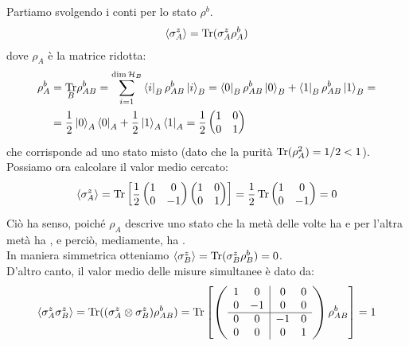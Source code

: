 \documentclass[../../InformazioneQuantistica.tex]{subfiles}
\begin{document}
Partiamo svolgendo i conti per lo stato $\rho^b$.
\begin{align*}
\langle \sigma_A^z\rangle = \operatorname{Tr}(\sigma_A^z \rho_A^b)
\end{align*}
dove $\rho_A$ è la matrice ridotta:
\begin{align*}
\rho_A^b &= \underset{B}{\operatorname{Tr}}\rho_{AB}^b = \sum_{i=1}^{\operatorname{dim}\mathcal{H}_B} \Bra{i}_B \rho_{AB}^b \Ket{i}_B = \Bra{0}_B \rho^b_{AB} \Ket{0}_B + \Bra{1}_B \rho^b_{AB} \Ket{1}_B =\\
&= \frac{1}{2}\Ket{0}_A\Bra{0}_A + \frac{1}{2}\Ket{1}_A \Bra{1}_A = \frac{1}{2}\begin{pmatrix}1 & 0\\0 & 1\end{pmatrix}
\end{align*}
che corrisponde ad uno stato misto (dato che la purità $\operatorname{Tr}(\rho_A^2)=1/2 < 1$).\\
Possiamo ora calcolare il valor medio cercato:
\begin{align*}
    \langle \sigma_A^z \rangle = \operatorname{Tr} \left[ \frac{1}{2} \begin{pmatrix}1 & 0\\ 0 & -1
    \end{pmatrix}\begin{pmatrix}1 & 0\\ 0 & 1 \end{pmatrix} \right ] = \frac{1}{2}\operatorname{Tr}\begin{pmatrix}1 & 0 \\ 0 & -1 \end{pmatrix} = 0
\end{align*}
Ciò ha senso, poiché $\rho_A$ descrive uno stato che la metà delle volte ha  e per l'altra metà ha , e perciò, mediamente, ha .\\
In maniera simmetrica otteniamo $\langle \sigma_B^z \rangle = \operatorname{Tr}(\sigma_B^z \rho_B^b) = 0$.\\

D'altro canto, il valor medio delle misure simultanee è dato da:
\begin{align*}
\langle \sigma_A^z \sigma_B^z \rangle = \operatorname{Tr}((\sigma_A^z \otimes \sigma_B^z) \rho_{AB}^b ) = \operatorname{Tr}\left[\left(
\begin{array}{cc|cc}
1 & 0 & 0 & 0\\
0 & -1 & 0 & 0\\ \hline
0 & 0 & -1 & 0\\
0 & 0 & 0 & 1
\end{array}
\right) \rho_{AB}^b \right]= 1
\end{align*}
\end{document}
